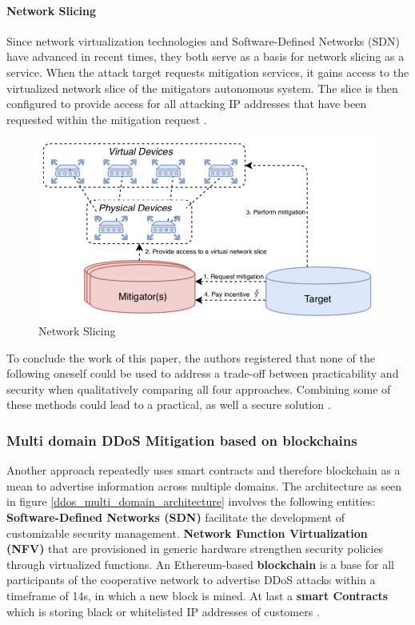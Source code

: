 \paragraph{Network Slicing}
Since network virtualization technologies and Software-Defined Networks (SDN) have advanced in recent times, they both serve as a basis for network slicing as a service. When the attack target requests mitigation services, it gains access to the virtualized network slice of the mitigators autonomous system. The slice is then configured to provide access for all attacking IP addresses that have been requested within the mitigation request \cite{Mannhart2018}.
\begin{figure}[ht]
  \begin{center}
    \includegraphics[scale=0.5]{Talk7/img/ddos/cooperative_network_network_slicing}
  \end{center}
  \caption{Network Slicing}
  \label{ddos_network_slicing}
\end{figure}

To conclude the work of this paper, the authors registered that none of the following oneself could be used to address a trade-off between practicability and security when qualitatively comparing all four approaches. Combining some of these methods could lead to a practical, as well a secure solution \cite{Mannhart2018}.


\subsubsection{Multi domain DDoS Mitigation based on blockchains}
Another approach repeatedly uses smart contracts and therefore blockchain as a mean to advertise information across multiple domains. The architecture as seen in figure \ref{ddos_multi_domain_architecture} involves the following entities: \textbf{Software-Defined Networks (SDN)} facilitate the development of customizable security management. \textbf{Network Function Virtualization (NFV)} that are provisioned in generic hardware strengthen security policies through virtualized functions. An Ethereum-based \textbf{blockchain} is a base for all participants of the cooperative network to advertise DDoS attacks within a timeframe of 14s, in which a new block is mined. At last a \textbf{smart Contracts} which is storing black or whitelisted IP addresses of customers \cite{Rodrigues2017}.


